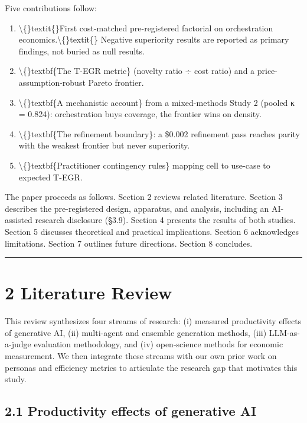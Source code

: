 \documentclass[11pt,a4paper]{article}
\begin{document}
Five contributions follow:

\begin{enumerate}
\item \textbackslash\{\}textit\{\}First cost-matched pre-registered factorial on orchestration
   economics.\textbackslash\{\}textit\{\} Negative superiority results are reported as primary
   findings, not buried as null results.
\item \textbackslash\{\}textbf\{The T-EGR metric\} (novelty ratio ÷ cost ratio) and a
   price-assumption-robust Pareto frontier.
\item \textbackslash\{\}textbf\{A mechanistic account\} from a mixed-methods Study 2 (pooled κ =
   0.824): orchestration buys coverage, the frontier wins on density.
\item \textbackslash\{\}textbf\{The refinement boundary\}: a \$0.002 refinement pass reaches parity
   with the weakest frontier but never superiority.
\item \textbackslash\{\}textbf\{Practitioner contingency rules\} mapping cell to use-case to
   expected T-EGR.
\end{enumerate}


The paper proceeds as follows. Section 2 reviews related literature.
Section 3 describes the pre-registered design, apparatus, and analysis,
including an AI-assisted research disclosure (§3.9).
Section 4 presents the results of both studies. Section 5 discusses
theoretical and practical implications. Section 6 acknowledges
limitations. Section 7 outlines future directions. Section 8 concludes.

\hrule


\section{2 Literature Review}

This review synthesizes four streams of research: (i) measured productivity
effects of generative AI, (ii) multi-agent and ensemble generation methods,
(iii) LLM-as-a-judge evaluation methodology, and (iv) open-science methods
for economic measurement. We then integrate these streams with our own prior
work on personas and efficiency metrics to articulate the research gap that
motivates this study.

\subsection{2.1 Productivity effects of generative AI}
\end{document}
